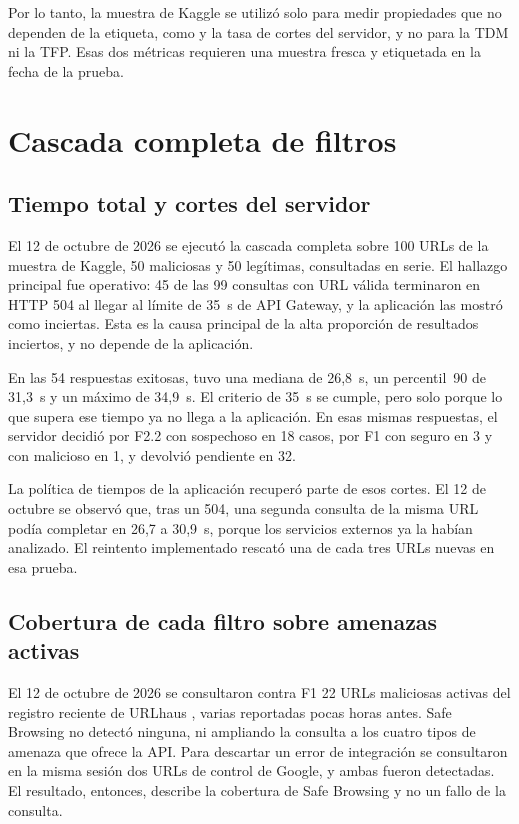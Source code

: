 Por lo tanto, la muestra de Kaggle se utilizó solo para medir propiedades que no dependen de la etiqueta, como \tfuno{} y la tasa de cortes del servidor, y no para la TDM ni la TFP. Esas dos métricas requieren una muestra fresca y etiquetada en la fecha de la prueba.

\section{Cascada completa de filtros}

\subsection{Tiempo total y cortes del servidor}

El 12 de octubre de 2026 se ejecutó la cascada completa sobre 100 URLs de la muestra de Kaggle, 50 maliciosas y 50 legítimas, consultadas en serie. El hallazgo principal fue operativo: 45 de las 99 consultas con URL válida terminaron en HTTP 504 al llegar al límite de 35~s de API Gateway, y la aplicación las mostró como inciertas. Esta es la causa principal de la alta proporción de resultados inciertos, y no depende de la aplicación.

En las 54 respuestas exitosas, \ttotal{} tuvo una mediana de 26,8~s, un percentil~90 de 31,3~s y un máximo de 34,9~s. El criterio de 35~s se cumple, pero solo porque lo que supera ese tiempo ya no llega a la aplicación. En esas mismas respuestas, el servidor decidió por F2.2 con sospechoso en 18 casos, por F1 con seguro en 3 y con malicioso en 1, y devolvió pendiente en 32.

La política de tiempos de la aplicación recuperó parte de esos cortes. El 12 de octubre se observó que, tras un 504, una segunda consulta de la misma URL podía completar en 26,7 a 30,9~s, porque los servicios externos ya la habían analizado. El reintento implementado rescató una de cada tres URLs nuevas en esa prueba.


\subsection{Cobertura de cada filtro sobre amenazas activas}

El 12 de octubre de 2026 se consultaron contra F1 22 URLs maliciosas activas del registro reciente de URLhaus \cite{urlhaus_api}, varias reportadas pocas horas antes. Safe Browsing no detectó ninguna, ni ampliando la consulta a los cuatro tipos de amenaza que ofrece la API. Para descartar un error de integración se consultaron en la misma sesión dos URLs de control de Google, y ambas fueron detectadas. El resultado, entonces, describe la cobertura de Safe Browsing y no un fallo de la consulta.

